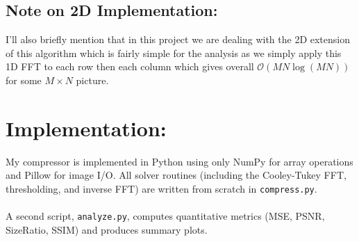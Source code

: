 \documentclass[12pt]{article}
\begin{document}
\subsection{Note on 2D Implementation:}
I'll also briefly mention that in this project we are dealing with the 2D extension of this algorithm which is fairly simple for the analysis as we simply apply this 1D FFT to each row then each column which gives overall $\mathcal{O}(MN \log (MN))$ for some $M \times N$ picture. 


\section{Implementation:}
My compressor is implemented in Python using only NumPy for array operations and Pillow for image I/O.  All solver routines (including the Cooley-Tukey FFT, thresholding, and inverse FFT) are written from scratch in \texttt{compress.py}.  
\\
\\
A second script, \texttt{analyze.py}, computes quantitative metrics (MSE, PSNR, SizeRatio, SSIM) and produces summary plots.
\end{document}
